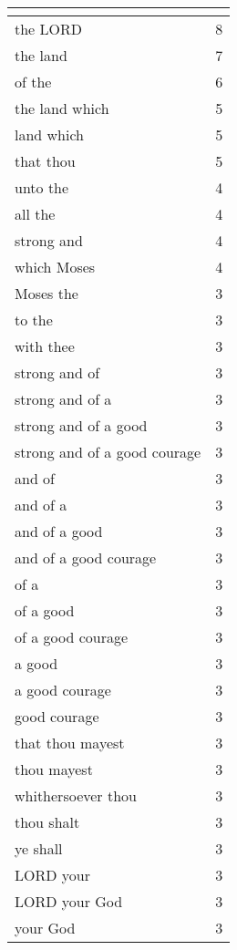 \begin{center}
\begin{longtable}{|p{3.0in}|p{0.5in}|}
\hline \multicolumn{2}{c}{{ }} \\ \hline
\endfoot 
the LORD & 8\\ \hline 
the land & 7\\ \hline 
of the & 6\\ \hline 
the land which & 5\\ \hline 
land which & 5\\ \hline 
that thou & 5\\ \hline 
unto the & 4\\ \hline 
all the & 4\\ \hline 
strong and & 4\\ \hline 
which Moses & 4\\ \hline 
Moses the & 3\\ \hline 
to the & 3\\ \hline 
with thee & 3\\ \hline 
strong and of & 3\\ \hline 
strong and of a & 3\\ \hline 
strong and of a good & 3\\ \hline 
strong and of a good courage & 3\\ \hline 
and of & 3\\ \hline 
and of a & 3\\ \hline 
and of a good & 3\\ \hline 
and of a good courage & 3\\ \hline 
of a & 3\\ \hline 
of a good & 3\\ \hline 
of a good courage & 3\\ \hline 
a good & 3\\ \hline 
a good courage & 3\\ \hline 
good courage & 3\\ \hline 
that thou mayest & 3\\ \hline 
thou mayest & 3\\ \hline 
whithersoever thou & 3\\ \hline 
thou shalt & 3\\ \hline 
ye shall & 3\\ \hline 
LORD your & 3\\ \hline 
LORD your God & 3\\ \hline 
your God & 3\\ \hline 
\end{longtable}
\end{center}





